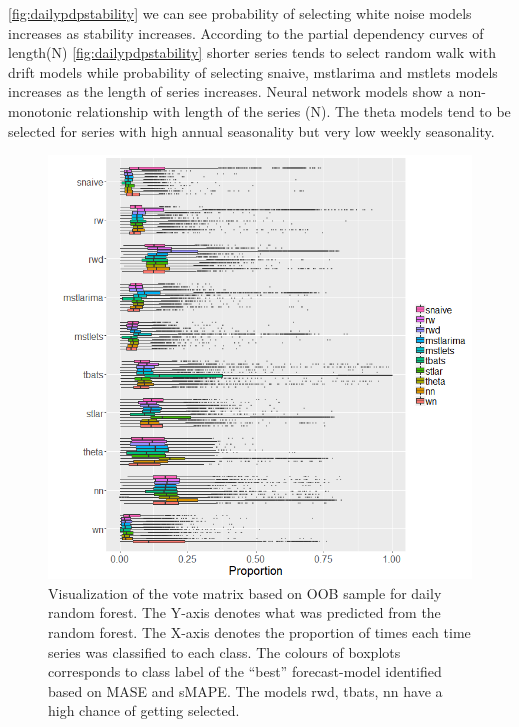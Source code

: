 \documentclass[11pt,a4paper,]{article}
\begin{document}
\autoref{fig:dailypdpstability} we can see probability of selecting white noise models increases as stability increases. According to the partial dependency curves of length(N)
\autoref{fig:dailypdpstability} shorter series tends to select random walk with drift models while probability of selecting snaive, mstlarima and mstlets models increases as the length of series increases. Neural network models show a non-monotonic relationship with length of the series (N). The theta models tend to be selected for series with high annual seasonality but
very low weekly seasonality.

\begin{figure}
\centering
\includegraphics{figures/oobdaily-1.png}
\caption{\label{fig:oobdaily}Visualization of the vote matrix based on OOB sample for daily random forest. The Y-axis denotes what was predicted from the random forest. The X-axis denotes the proportion of times each time series was classified to each class. The colours of boxplots corresponds to class label of the ``best'' forecast-model identified based on MASE and sMAPE. The models rwd, tbats, nn have a high chance of getting selected.}
\end{figure}
\end{document}
